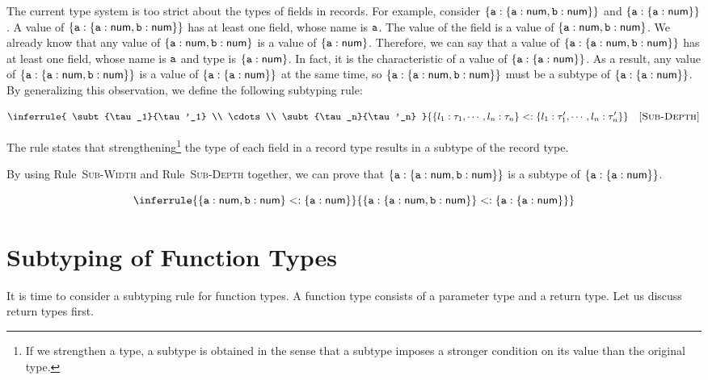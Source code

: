 The current type system is too strict about the types of fields in records.
For example, consider $\{\texttt{a}:\{\texttt{a}:\textsf{num},\texttt{b}:\textsf{num}\}\}$ and
$\{\texttt{a}:\{\texttt{a}:\textsf{num}\}\}$. A value of $\{\texttt{a}:\{\texttt{a}:\textsf{num},\texttt{b}:\textsf{num}\}\}$ has at
least one field, whose name is $\texttt{a}$. The value of the field is a value of
$\{\texttt{a}:\textsf{num},\texttt{b}:\textsf{num}\}$. We already know that any value of
$\{\texttt{a}:\textsf{num},\texttt{b}:\textsf{num}\}$ is a value of $\{\texttt{a}:\textsf{num}\}$. Therefore, we can
say that a value of $\{\texttt{a}:\{\texttt{a}:\textsf{num},\texttt{b}:\textsf{num}\}\}$ has at least one field,
whose name is $\texttt{a}$ and type is $\{\texttt{a}:\textsf{num}\}$. In fact, it is the characteristic of a
value of $\{\texttt{a}:\{\texttt{a}:\textsf{num}\}\}$. As a result, any value of
$\{\texttt{a}:\{\texttt{a}:\textsf{num},\texttt{b}:\textsf{num}\}\}$ is a value of $\{\texttt{a}:\{\texttt{a}:\textsf{num}\}\}$ at the
same time, so $\{\texttt{a}:\{\texttt{a}:\textsf{num},\texttt{b}:\textsf{num}\}\}$ must be a subtype of
$\{\texttt{a}:\{\texttt{a}:\textsf{num}\}\}$. By
generalizing this observation, we define the following subtyping rule:


\[
  \inferrule
  { \subt{\tau_1}{\tau'_1} \\ \cdots \\
    \subt{\tau_n}{\tau'_n} }
  { \subt{\{l_1:\tau_1,\cdots,l_n:\tau_n\}}{\{l_1:\tau'_1,\cdots,l_n:\tau'_n\}} }
  \quad\textsc{[Sub-Depth]}
\]

The rule states that strengthening\footnote{If we strengthen a type, a subtype
is obtained in the sense that a subtype imposes a stronger condition on its
value than the original type.} the type of each field in a record type
results in a subtype of the record type.

By using Rule~\textsc{Sub-Width} and Rule~\textsc{Sub-Depth} together, we can
prove that $\{\texttt{a}:\{\texttt{a}:\textsf{num},\texttt{b}:\textsf{num}\}\}$ is a subtype of
$\{\texttt{a}:\{\texttt{a}:\textsf{num}\}\}$.

\[
  \inferrule
  { \{\ca:\tnum,\cb:\tnum\}<:\{\ca:\tnum\} }
  { \{\ca:\{\ca:\tnum,\cb:\tnum\}\}<:\{\ca:\{\ca:\tnum\}\} }
\]

\section{Subtyping of Function Types}

It is time to consider a subtyping rule for function types. A function type
consists of a parameter type and a return type. Let us discuss
return types first.

